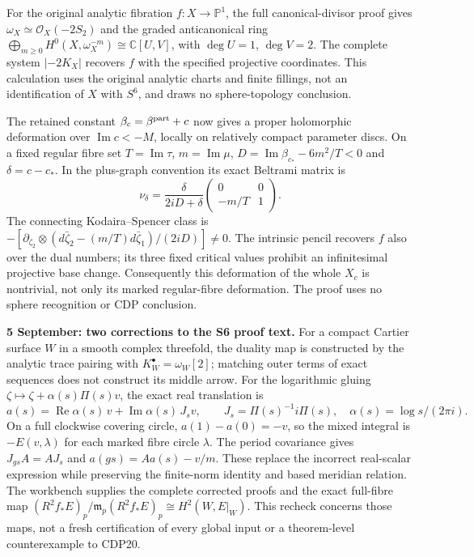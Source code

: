 \documentclass[10pt,letterpaper]{article}
\begin{document}
For the original analytic fibration $f:X\to\mathbb P^1$, the full
canonical-divisor proof gives
$\omega_X\simeq\mathcal O_X(-2S_2)$ and the graded anticanonical ring
$\bigoplus_{m\ge0}H^0(X,\omega_X^{-m})\cong\mathbb C[U,V]$,
with $\deg U=1$, $\deg V=2$. The complete system $|-2K_X|$
recovers $f$ with the specified projective coordinates. This calculation
uses the original analytic charts and finite fillings, not an
identification of $X$ with $S^6$, and draws no sphere-topology conclusion.

The retained constant $\beta_c=\beta^{\rm part}+c$ now gives a proper
holomorphic deformation over $\operatorname{Im}c<-M$, locally on
relatively compact parameter discs. On a fixed regular fibre set
$T=\operatorname{Im}\tau$, $m=\operatorname{Im}\mu$,
$D=\operatorname{Im}\beta_{c_*}-6m^2/T<0$ and $\delta=c-c_*$.
In the plus-graph convention its exact Beltrami matrix is
\[
 \nu_\delta=\frac{\delta}{2iD+\delta}
                 \begin{pmatrix}0&0\\-m/T&1\end{pmatrix}.
\]
The connecting Kodaira--Spencer class is
$-[\partial_{\zeta_2}\otimes
(d\bar\zeta_2-(m/T)d\bar\zeta_1)/(2iD)]\ne0$.
The intrinsic pencil recovers $f$ also over the dual numbers; its three
fixed critical values prohibit an infinitesimal projective base change.
Consequently this deformation of the whole $X_c$ is nontrivial,
not only its marked regular-fibre deformation. The proof uses no sphere
recognition or CDP conclusion.


\noindent\textbf{5 September: two corrections to the S6 proof text.}
For a compact Cartier surface $W$ in a smooth complex threefold, the
duality map is constructed by the analytic trace pairing with
$K_W^\bullet=\omega_W[2]$; matching outer terms of exact sequences
does not construct its middle arrow. For the logarithmic gluing
$\zeta\mapsto\zeta+\alpha(s)\Pi(s)v$, the exact real translation is
\[
 a(s)=\operatorname{Re}\alpha(s)\,v+
       \operatorname{Im}\alpha(s)\,J_sv,\qquad
 J_s=\Pi(s)^{-1}i\Pi(s),\quad \alpha(s)=\log s/(2\pi i).
\]
On a full clockwise covering circle, $a(1)-a(0)=-v$, so the mixed
integral is $-E(v,\lambda)$ for each marked fibre circle $\lambda$.
The period covariance gives $J_{gs}A=AJ_s$ and
$a(gs)=Aa(s)-v/m$. These replace the incorrect real-scalar expression
while preserving the finite-norm identity and based meridian relation.
The workbench supplies the complete corrected proofs and the exact
full-fibre map
$(R^2f_*E)_p/\mathfrak m_p(R^2f_*E)_p\cong H^2(W,E|_W)$.
This recheck concerns those maps, not a fresh certification of every
global input or a theorem-level counterexample to CDP20.
\end{document}
